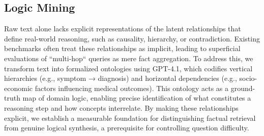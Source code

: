 \documentclass{article} %
\begin{document}
\subsection{Logic Mining}
Raw text alone lacks explicit representations of the latent relationships that define real-world reasoning, such as causality, hierarchy, or contradiction. Existing benchmarks often treat these relationships as implicit, leading to superficial evaluations of ``multi-hop`` queries as mere fact aggregation. To address this, we transform text into formalized ontologies using GPT-4.1, which codifies vertical hierarchies (e.g., symptom → diagnosis) and horizontal dependencies (e.g., socio-economic factors influencing medical outcomes). This ontology acts as a ground-truth map of domain logic, enabling precise identification of what constitutes a reasoning step and how concepts interrelate. By making these relationships explicit, we establish a measurable foundation for distinguishing factual retrieval from genuine logical synthesis, a prerequisite for controlling question difficulty.
\end{document}
